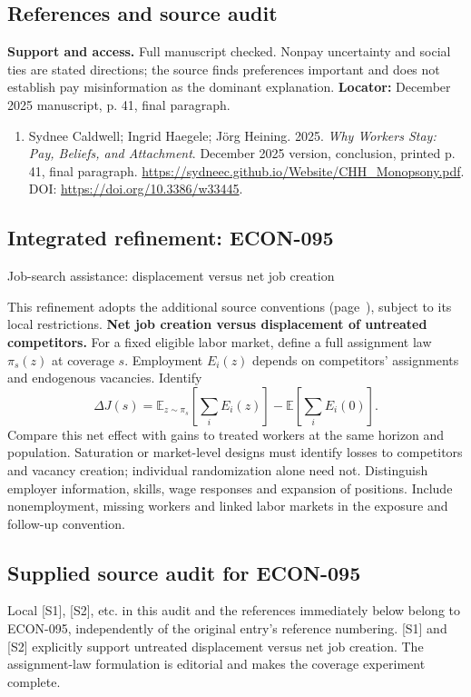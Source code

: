 \documentclass[11pt,a4paper]{article}
\begin{document}
\subsection*{References and source audit}
\textbf{Support and access.} Full manuscript checked. Nonpay uncertainty and social ties are stated directions; the source finds preferences important and does not establish pay misinformation as the dominant explanation. \textbf{Locator:} December 2025 manuscript, p. 41, final paragraph.
\begin{enumerate}\raggedright
\item\hypertarget{definitions:source:30007634:1}{} Sydnee Caldwell; Ingrid Haegele; Jörg Heining. 2025. \emph{Why Workers Stay: Pay, Beliefs, and Attachment}. December 2025 version, conclusion, printed p. 41, final paragraph.
\url{https://sydneec.github.io/Website/CHH_Monopsony.pdf}.
DOI: \url{https://doi.org/10.3386/w33445}.
\end{enumerate}

\subsection*{Integrated refinement: ECON-095}
{\sffamily\small\color{muted}Job-search assistance: displacement versus net job creation\par}
This refinement adopts the additional source conventions
(page~\pageref{audited:conventions}), subject to its local restrictions.
\textbf{Net job creation versus displacement of untreated competitors.}
For a fixed eligible labor market, define a full assignment law $\pi_s(z)$
at coverage $s$. Employment $E_i(z)$ depends on competitors' assignments and
endogenous vacancies. Identify
\[
\Delta J(s)=\mathbb E_{z\sim\pi_s}\!\left[\sum_iE_i(z)\right]
              -\mathbb E\left[\sum_iE_i(0)\right].
\]
Compare this net effect with gains to treated workers at the same horizon and
population. Saturation or market-level designs must identify losses to
competitors and vacancy creation; individual randomization alone need not.
Distinguish employer information, skills, wage responses and expansion of
positions. Include nonemployment, missing workers and linked labor markets in
the exposure and follow-up convention.
\subsection*{Supplied source audit for ECON-095}
Local [S1], [S2], etc. in this audit and the references immediately below
belong to ECON-095, independently of the original entry's reference numbering.
[S1] and [S2] explicitly support untreated displacement versus net job creation. The assignment-law formulation is editorial and makes the coverage experiment complete.
\end{document}
